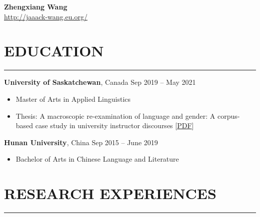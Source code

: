 \documentclass[a4paper, 11pt]{article}  %
\begin{document}

\begin{center}

	\huge \textbf{Zhengxiang Wang} \vspace{11pt} \\  %
	\small \url{http://jaaack-wang.eu.org/} 

\end{center}

\section*{EDUCATION} %
\hrule %
\vspace{11pt} %

\textbf{University of Saskatchewan}, Canada \hfill Sep 2019 – May 2021 %

\begin{itemize}
	\itemsep0em %
	
	\item{Master of Arts in Applied Linguistics}
	\item{Thesis: A macroscopic re-examination of language and gender: A corpus-based case study in university instructor discourses [\href{https://harvest.usask.ca/bitstream/handle/10388/13387/WANG-THESIS-2021.pdf?sequence=1\&isAllowed=y}{PDF}]}
	
\end{itemize}

\vspace{11pt}

\noindent
\textbf{Hunan University}, China \hfill Sep 2015 – June 2019

\begin{itemize}
	\itemsep0em 
	
	\item{Bachelor of Arts in Chinese Language and Literature}
	
\end{itemize}


\section*{RESEARCH EXPERIENCES}
\hrule 
\vspace{11pt}
\end{document}
